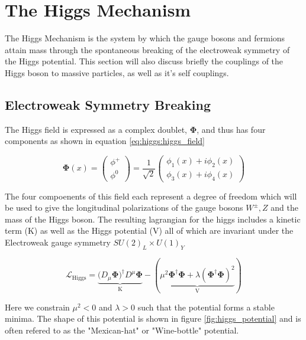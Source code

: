 \section{The Higgs Mechanism} \label{sec:theory:higgs}

The Higgs Mechanism is the system by which the gauge bosons and fermions attain
mass through the spontaneous breaking of the electroweak symmetry of the Higgs
potential.  This section will also discuss briefly the couplings of the Higgs
boson to massive particles, as well as it's self couplings.

\subsection{Electroweak Symmetry Breaking}

The Higgs field is expressed as a complex doublet, $\boldsymbol{\Phi}$, and thus
has four components as shown in equation \ref{eq:higgs:higgs_field}

\begin{equation} \label{eq:higgs:higgs_field}
\boldsymbol{\Phi}(x) = \left( \begin{matrix} \phi^{+} \\ \phi^{0} \end{matrix}
\right) = \frac{1}{\sqrt{2}} \left( \begin{matrix} \phi_{1}(x) + i\phi_{2}(x) \\
\phi_{3}(x) + i\phi_{4}(x) \end{matrix} \right)
\end{equation}

The four compoenents of this field each represent a degree of freedom which will
be used to give the longitudinal polarizations of the gauge bosons $W^{\pm},Z$
and the mass of the Higgs boson.  The resulting lagrangian for the higgs
includes a kinetic term (K) as well as the Higgs potential (V) all of which are
invariant under the Electroweak gauge symmetry $SU(2)_L \times U(1)_Y$

\begin{equation} \label{eq:higgs:lagrangian}
\mathcal{L}_{\text{Higgs}} =
\underbrace{(D_{\mu}\boldsymbol{\Phi)^{\dagger}}D^{\mu}\boldsymbol{\Phi}}_{\text{K}}
- (\underbrace{\mu^{2}\boldsymbol{\Phi}^{\dagger}\boldsymbol{\Phi} +
  \lambda(\boldsymbol{\Phi}^{\dagger}\boldsymbol{\Phi})^{2}}_{\text{V}})
\end{equation}

Here we constrain $\mu^{2} < 0$ and $\lambda > 0$ such that the potential forms
a stable minima.  The shape of this potential is shown in figure
\ref{fig:higgs_potential} and is often refered to as the "Mexican-hat" or
"Wine-bottle" potential. 

